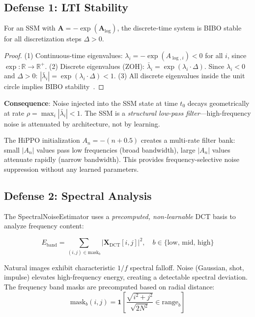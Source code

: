 \documentclass[conference]{IEEEtran}
\begin{document}
\subsection{Defense 1: LTI Stability}

\begin{theorem}
For an SSM with $\mathbf{A} = -\exp(\mathbf{A}_{\log})$, the discrete-time system is BIBO stable for all discretization steps $\Delta > 0$.
\end{theorem}

\begin{proof}
(1) Continuous-time eigenvalues: $\lambda_i = -\exp(A_{\log,i}) < 0$ for all $i$, since $\exp: \mathbb{R} \to \mathbb{R}^+$.
(2) Discrete eigenvalues (ZOH): $\bar{\lambda}_i = \exp(\lambda_i \cdot \Delta)$. Since $\lambda_i < 0$ and $\Delta > 0$: $|\bar{\lambda}_i| = \exp(\lambda_i \cdot \Delta) < 1$.
(3) All discrete eigenvalues inside the unit circle implies BIBO stability~\cite{ogata2010modern}.
\end{proof}

\textbf{Consequence}: Noise injected into the SSM state at time $t_0$ decays geometrically at rate $\rho = \max_i |\bar{\lambda}_i| < 1$. The SSM is a \emph{structural low-pass filter}---high-frequency noise is attenuated by architecture, not by learning.

The HiPPO initialization $A_n = -(n+0.5)$ creates a multi-rate filter bank: small $|A_n|$ values pass low frequencies (broad bandwidth), large $|A_n|$ values attenuate rapidly (narrow bandwidth). This provides frequency-selective noise suppression without any learned parameters.

\subsection{Defense 2: Spectral Analysis}

The SpectralNoiseEstimator uses a \emph{precomputed, non-learnable} DCT basis to analyze frequency content:

\begin{equation}
E_{\text{band}} = \sum_{(i,j) \in \text{mask}_b} |\mathbf{X}_{\text{DCT}}[i,j]|^2, \quad b \in \{\text{low, mid, high}\}
\end{equation}

Natural images exhibit characteristic $1/f$ spectral falloff. Noise (Gaussian, shot, impulse) elevates high-frequency energy, creating a detectable spectral deviation. The frequency band masks are precomputed based on radial distance:
\begin{equation}
\text{mask}_b(i,j) = \mathbf{1}\!\left[\frac{\sqrt{i^2 + j^2}}{\sqrt{2N^2}} \in \text{range}_b\right]
\end{equation}
\end{document}
